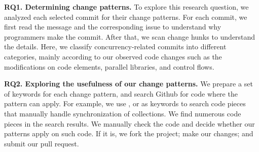 
\textbf{RQ1. Determining change patterns.} To explore this research question, we analyzed each selected commit for their change patterns. For each commit, we first read the message and the corresponding issue to understand why programmers make the commit. After that, we scan change hunks to understand the details. Here, we classify concurrency-related commits into different categories, mainly according to our observed code changes such as the modifications on code elements, parallel libraries, and control flows.




\textbf{RQ2. Exploring the usefulness of our change patterns.} We prepare a set of keywords for each change pattern, and search Github for code where the pattern can apply. For example, we use ,  or  as keywords to search code pieces that manually handle synchronization of collections. We find numerous code pieces in the search results. We manually check the code and decide whether our patterns apply on such code. If it is, we fork the project; make our changes; and submit our pull request.







